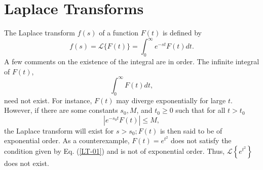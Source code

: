 \chapter{Laplace Transforms}
The Laplace transform $f(s)$ of a function $F(t)$ is defined by 
\begin{equation}
f(s)=\mathcal{L}\{F(t)\}=\int_{0}^{\infty} e^{-s t} F(t) d t .
\end{equation}
A few comments on the existence of the integral are in order. The infinite integral of $F(t)$,
\begin{equation*}
\int_{0}^{\infty} F(t) d t,
\end{equation*}
need not exist. For instance, $F(t)$ may diverge exponentially for large $t$. However, if there are some constants $s_{0}, M$, and $t_{0} \geq 0$ such that for all $t>t_{0}$
\begin{equation}
\left|e^{-s_{0} t} F(t)\right| \leq M,\label{LT-01}
\end{equation}
the Laplace transform will exist for $s>s_{0} ; F(t)$ is then said to be of exponential order. As a counterexample, $F(t)=e^{t^{2}}$ does not satisfy the condition given by Eq. (\ref{LT-01}) and is not of exponential order. Thus, $\mathcal{L}\left\{e^{t^{2}}\right\}$ does not exist.


